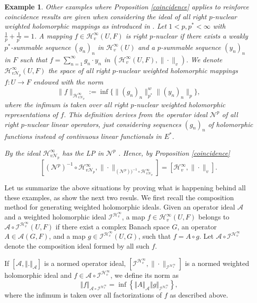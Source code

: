 \documentclass[12pt]{amsart}
\theoremstyle{plain}
\newtheorem{example}[theorem]{Example}
\numberwithin{equation}{section}
\begin{document}
\begin{example}
Other examples where Proposition \ref{coincidence} applies to reinforce coincidence results are given when considering the ideal of all right $p$-nuclear  weighted holomorphic mappings as introduced in \cite{CaJiKe}. Let $1<p,p^*<\infty $ with $\frac 1p+\frac 1{p^*}=1$. A mapping $f\in \mathcal H_{v}^\infty(U,F)$ is right $p$-nuclear if there exists a weakly $p^*$-summable  sequence $(g_n)_n$ in $\mathcal H_v^\infty(U)$ and a $p$-summable sequence $(y_n)_n$ in $F$  such that $f=\sum_{n=1}^\infty g_n\cdot y_n$ in $(\mathcal H_v^\infty (U,F),\|\cdot\|_v)$. We denote $\mathcal H_{v\mathcal N_p}^\infty(U,F)$ the space of all right $p$-nuclear  weighted holomorphic mappings $f:U\to F$ endowed with the norm
$$
\|f\|_{\mathcal H_{v\mathcal N_p}^\infty}:=\inf\{\|(g_n)_n\|_{p^*}^w\|(y_n)_n\|_p\},
$$
where the infimum is taken over all right $p$-nuclear  weighted holomorphic representations of $f$. This definition derives from the operator ideal $\mathcal N^p$ of all right $p$-nuclear linear operators, just considering sequences  $(g_n)_n$ of holomorphic functions instead of continuous linear functionals in $E^*$.

By \cite[Proposition 2.28]{CaJiKe} the ideal $\mathcal H_{v\mathcal N_p}^\infty$ has the LP in $\mathcal N^p$ . Hence, by Proposition \ref{coincidence} 
$$
[(\mathcal N^p)^{-1}\circ \mathcal H_{v\mathcal N_p}^\infty, \|\cdot \|_{(\mathcal N^p))^{-1}\circ \mathcal H_{v\mathcal N_p}^\infty}]=[\mathcal H_v^\infty,\|\cdot\|_v].
$$
\end{example}

Let us summarize the above situations by proving what is happening behind all these examples, as show the next two resuls. We first recall the composition method for generating weighted holomorphic
ideals. Given an operator ideal $\mathcal{A}$ and a  weighted holomorphic ideal $\mathcal I^{\mathcal H_v^\infty}$, a map $f\in \mathcal{H}%
_{v}^{\infty }(U,F)$ belongs to $ \mathcal{A}\circ \mathcal I^{\mathcal H_v^\infty}(U,F)$ if there exist a complex Banach space $G$, an operator 
$A\in \mathcal{A}\left( G,F\right) $, and a map $g\in \mathcal I^{\mathcal H_v^\infty}(U,G)$, such that $f=A\circ g$. Let   $\mathcal{A}\circ 
\mathcal I^{\mathcal H_v^\infty}$ denote the composition ideal formed by all such $f$.

If $\left[ \mathcal{A},\left\Vert .\right\Vert _{\mathcal{A}}\right] $ is a
normed operator ideal, $[\mathcal I^{\mathcal H_v^\infty}, \|\cdot\|_{\mathcal I^{\mathcal H_v^\infty}}]$ is a normed weighted holomorphic ideal and $f\in \mathcal{A}\circ \mathcal I^{\mathcal H_v^\infty}$,
we define its norm as%
\begin{equation*}
\left\Vert f\right\Vert _{\mathcal{A}\circ \mathcal I^{\mathcal H_v^\infty}}=\inf
\left\{ \left\Vert A\right\Vert _{\mathcal{A}}\left\Vert g\right\Vert
_{\mathcal I^{\mathcal H_v^\infty}}\right\} \text{,}
\end{equation*}%
where the infimum is taken over all factorizations of $f$ as described above.
\end{document}
